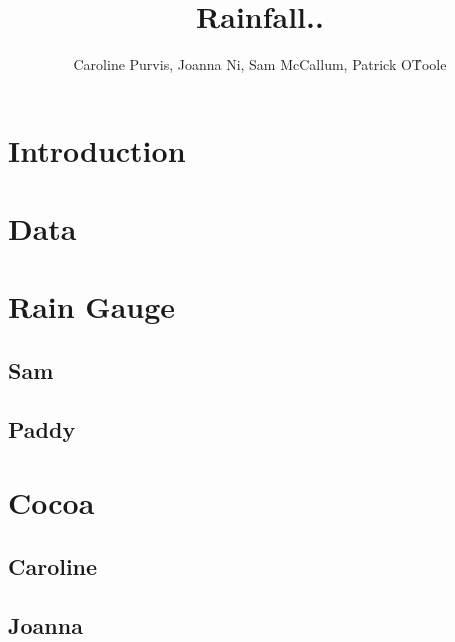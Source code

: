 \documentclass{article}
\title{Rainfall..}
\author{Caroline Purvis, Joanna Ni, Sam McCallum, Patrick O\'Toole}
\date{}
\begin{document}
\maketitle

\clearpage

\begin{abstract} 
    \noindent \Blindtext{}
\end{abstract}


\section{Introduction}

\section{Data}

\section{Rain Gauge}

\subsection{Sam}

\subsection{Paddy}

\newpage

\section{Cocoa}

\subsection{Caroline}

\subsection{Joanna}
\end{document}
